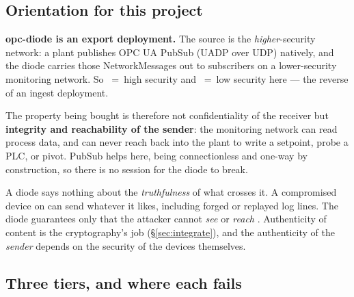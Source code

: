 \documentclass[11pt,a4paper]{article}
\begin{document}
\subsection{Orientation for this project}
\label{sec:orient}

\textbf{opc-diode is an export deployment.} The source is the
\emph{higher}-security network: a plant publishes OPC UA PubSub (UADP over
UDP) natively, and the diode carries those NetworkMessages out to subscribers
on a lower-security monitoring network. So \srcside{}~=~high security and
\dstside{}~=~low security here --- the reverse of an ingest deployment.

The property being bought is therefore not confidentiality of the receiver but
\textbf{integrity and reachability of the sender}: the monitoring network can
read process data, and can never reach back into the plant to write a
setpoint, probe a PLC, or pivot. PubSub helps here, being connectionless and
one-way by construction, so there is no session for the diode to break.

\begin{notebox}
A diode says nothing about the \emph{truthfulness} of what crosses it. A
compromised device on \srcside{} can send whatever it likes, including forged
or replayed log lines. The diode guarantees only that the attacker cannot
\emph{see} or \emph{reach} \dstside{}. Authenticity of content is the
cryptography's job (\S\ref{sec:integrate}), and the authenticity of the
\emph{sender} depends on the security of the \srcside{} devices themselves.
\end{notebox}

\subsection{Three tiers, and where each fails}
\end{document}
